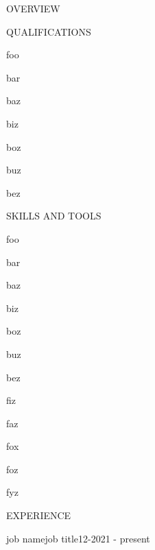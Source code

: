 \documentclass{resume}
\begin{document}
    \heading

    \MakeUppercase{\huge overview}
    
    \lipsum[1]

    \MakeUppercase{\huge qualifications}
    \begin{qualifications}
        \item foo
        \item bar
        \item baz
        \item biz
        \item boz
        \item buz
        \item bez
    \end{qualifications}

    \MakeUppercase{\huge skills and tools}

    \begin{skills}{4}
        \item foo
        \item bar
        \item baz
        \item biz
        \item boz
        \item buz
        \item bez
        \item fiz
        \item faz
        \item fox
        \item foz
        \item fyz
    \end{skills}

    \MakeUppercase{\huge experience}
    
    \begin{job}{job name}{job title}{12-2021 - present}
        \lipsum[2]
    \end{job}
    
\end{document}
